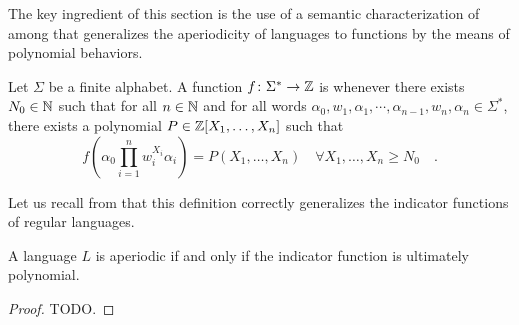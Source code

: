 The key ingredient of this section is the use of a semantic characterization of
 among 
that generalizes the aperiodicity of languages to functions by the means of
polynomial behaviors.

\begin{definition}
    \label{ultimately-polynomial:def}
    Let $\Sigma$ be a finite alphabet. 
    A function $f \colon \Sigma^* \to \mathbb{Z}$
    is 
    whenever there exists $N_0 \in \mathbb{N}$ such that
    for all $n \in \mathbb{N}$
    and for all words $\alpha_0, w_1, \alpha_1, \cdots, \alpha_{n-1}, w_n, \alpha_n
    \in \Sigma^*$, there exists a polynomial $P \in \mathbb{Z}[X_1, \dots, X_n]$
    such that
    \begin{equation*}
        f\left(
            \alpha_0 \prod_{i = 1}^{n} w_i^{X_i} \alpha_i
        \right)
        = 
        P(X_1, \dots, X_n)
        \quad 
        \forall X_1, \dots, X_n \geq N_0
        \quad .
    \end{equation*}
\end{definition}


Let us recall from \cite{LOPEZ23b} that this definition correctly
generalizes the indicator functions of regular languages.

\begin{example}
    A language $L$ is aperiodic if and only if 
    the indicator function is ultimately polynomial.
\end{example}
\begin{proof}
    TODO.
\end{proof}

